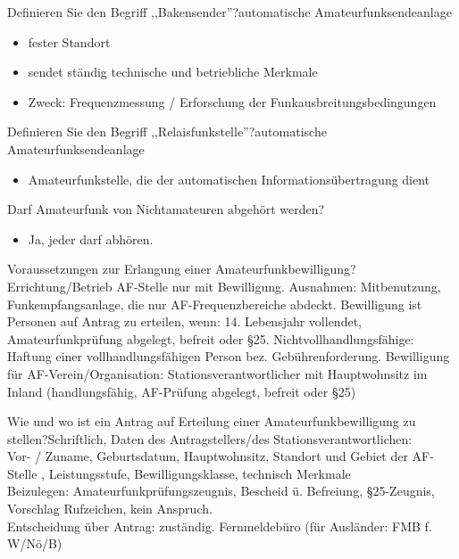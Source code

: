 \documentclass[avery5371,grid,frame,a4paper]{flashcards}
\newcommand{\card}[3]{
  \begin{flashcard}[{\chap} -- #1]{#2}#3\end{flashcard}
}
\begin{document}
\card{23}{Definieren Sie den Begriff ,,Bakensender''?}{automatische Amateurfunksendeanlage\begin{itemize}\itemsep1pt \item fester Standort \item sendet ständig technische und betriebliche Merkmale \item Zweck: Frequenzmessung / Erforschung der Funkausbreitungsbedingungen\end{itemize}}

\card{24}{Definieren Sie den Begriff ,,Relaisfunkstelle''?}{automatische Amateurfunksendeanlage\begin{itemize}\itemsep1pt \item Amateurfunkstelle, die der automatischen Informationsübertragung dient\end{itemize}}

\card{25}{ Darf Amateurfunk von Nichtamateuren abgehört werden?}{\begin{itemize}\itemsep1pt \item Ja, jeder darf abhören.\end{itemize}}

\card{26}{Voraussetzungen zur Erlangung einer Amateurfunkbewilligung?}{Errichtung/Betrieb AF-Stelle nur mit Bewilligung. Ausnahmen:  Mitbenutzung, Funkempfangsanlage, die nur AF-Frequenzbereiche abdeckt. Bewilligung ist Personen auf Antrag zu erteilen, wenn: 14. Lebensjahr vollendet, Amateurfunkprüfung abgelegt, befreit oder §25. Nichtvollhandlungsfähige: Haftung einer vollhandlungsfähigen Person bez. Gebührenforderung. Bewilligung für AF-Verein/Organisation: Stationsverantwortlicher mit Hauptwohnsitz im Inland (handlungsfähig, AF-Prüfung abgelegt, befreit oder §25)}

\card{27}{Wie und wo ist ein Antrag auf Erteilung einer Amateurfunkbewilligung zu stellen?}{Schriftlich, Daten des Antragstellers/des Stationsverantwortlichen:\\ Vor- / Zuname, Geburtsdatum, Hauptwohnsitz, Standort und Gebiet der AF-Stelle , Leistungsstufe, Bewilligungsklasse, technisch Merkmale \\ Beizulegen: Amateurfunkprüfungszeugnis, Bescheid ü. Befreiung, §25-Zeugnis, Vorschlag Rufzeichen, kein Anspruch. \\ Entscheidung über Antrag: zuständig. Fernmeldebüro (für Ausländer: FMB f. W/Nö/B)}

\end{document}
